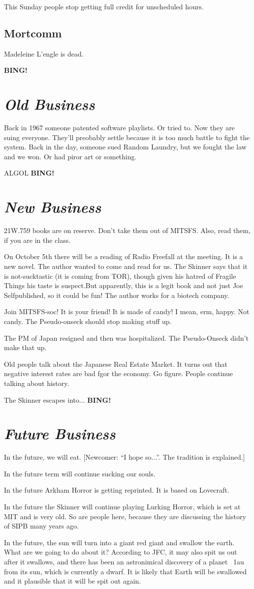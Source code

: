 \documentclass[10pt]{article}
\newcommand{\bing}{{\bf BING!} }
\newcommand{\goto}[1]{\bing \vskip 12pt \section*{{\em{#1}}}}
\begin{document}
This Sunday people stop getting full credit for unscheduled hours.

\subsection*{Mortcomm}

Madeleine L'engle is dead.

\goto{Old Business}

Back in 1967 someone patented software playlists. Or tried to. Now they are suing everyone. They'll preobably settle because it is too much battle to fight the system. Back in the day, someone sued Random Laundry, but we fought the law and we won. Or had piror art or something.

ALGOL
\goto{New Business}
21W.759 books are on reserve. Don't take them out of MITSFS. Also, read them, if you are in the class.

On October 5th there will be a reading of Radio Freefall at the meeting. It is a new novel. The author wanted to come and read for us. The Skinner says that it is not-sucktastic (it is coming from TOR), though given his hatred of Fragile Things his taste is suspect.But apparently, this is a legit book and not just Joe Selfpublished, so it could be fun! The author works for a biotech company.

Join MITSFS-soc! It is your friend! It is made of candy! I mean, erm, happy. Not candy. The Pseudo-onseck should stop making stuff up.

The PM of Japan resigned and then was hospitalized. The Pseudo-Onseck didn't make that up. 

Old people talk about the Japanese Real Estate Market. It turns out that negative interest rates are bad fgor the economy. Go figure. People continue talking about history.

The Skinner escapes into...
\goto{Future Business}

In the future, we will eat. [Newcomer: ``I hope so...''. The tradition is explained.]

In the future term will continue sucking our souls.

In the future Arkham Horror is getting reprinted. It is based on Lovecraft.

In the future the Skinner will continue playing Lurking Horror, which is set at MIT and is very old. So are people here, because they are discussing the history of SIPB many years ago. 

In the future, the sun will turn into a giant red giant and swallow the earth. What are we going to do about it? According to JFC, it may also spit us out after it swallows, and there has been an astronimical discovery of a planet ~1au from its sun, which is currently a dwarf. It is likely that Earth will be swallowed and it plausible that it will be spit out again. 
\end{document}
